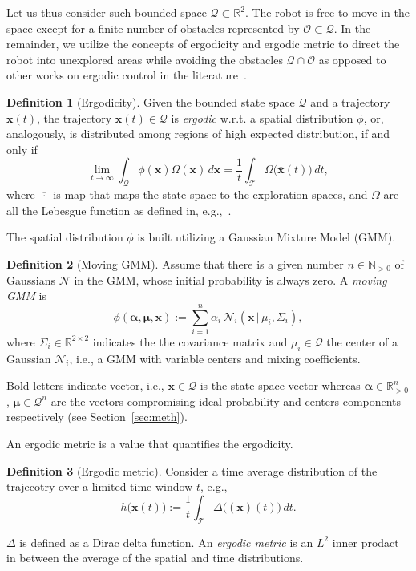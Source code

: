 \documentclass[letterpaper,10pt,conference,twoside]{IEEEtran}
\theoremstyle{definition}
\newtheorem{defn}{Definition}[section]
\begin{document}
Let us thus consider such bounded space $\mathcal{Q}\subset\mathbb{R}^2$. The robot is free to move in the space except for a finite number of obstacles represented by $\mathcal{O}\subset\mathcal{Q}$.  
In the remainder, we utilize the concepts of ergodicity and ergodic metric to direct the robot into unexplored areas while avoiding the obstacles $\mathcal{Q}\cap\mathcal{O}$ as opposed to other works on ergodic control in the literature~\cite{}.
\begin{defn}[Ergodicity]
  Given the bounded state space $\mathcal{Q}$ and a trajectory $\mathbf{x}(t)$, the trajectory $\mathbf{x}(t)\in\mathcal{Q}$ is \textit{ergodic} w.r.t. a spatial distribution $\phi$, or, analogously, is distributed among regions of high expected distribution, if and only if
  \begin{equation}
    \lim_{t\rightarrow\infty}{\int_{\mathcal{Q}}\phi(\mathbf{x})\Omega(\mathbf{x})\,d\mathbf{x}=\frac{1}{t}\int_{\mathcal{T}}{{\Omega\big(\overline{\mathbf{x}}(t)\big)}}\,dt},
  \end{equation}
  where $\overline{\,\cdot\,}$ is map that maps the state space to the exploration spaces, and $\Omega$ are all the Lebesgue function as defined in, e.g.,~\cite{}.
\end{defn}

The spatial distribution $\phi$ is built utilizing a Gaussian Mixture Model (GMM). 
\begin{defn}[Moving GMM]
  Assume that there is a given number $n\in\mathbb{N}_{>0}$ of Gaussians $\mathcal{N}$ in the GMM, whose initial probability is always zero. A \textit{moving GMM} is
  \begin{equation}
    \phi(\boldsymbol{\alpha},\boldsymbol{\mu},\mathbf{x}):=\sum_{i=1}^n{\alpha_i\,\mathcal{N}_i(\mathbf{x}\,|\,\mu_i,\Sigma_i)},
  \end{equation}
  where $\Sigma_i\in\mathbb{R}^{2\times 2}$ indicates the the covariance matrix and $\mu_i\in\mathcal{Q}$ the center of a Gaussian $\mathcal{N}_i$, i.e., a GMM with variable centers and mixing coefficients.
  
  Bold letters indicate vector, i.e., $\mathbf{x}\in\mathcal{Q}$ is the state space vector whereas $\boldsymbol{\alpha}\in\mathbb{R}_{>0}^n$, $\boldsymbol{\mu}\in\mathcal{Q}^n$ are the vectors compromising ideal probability and centers components respectively (see Section~\ref{sec:meth}).
   
\end{defn}

An ergodic metric is a value that quantifies the ergodicity.
\begin{defn}[Ergodic metric]
  Consider a time average distribution of the trajecotry over a limited time window $t$, e.g.,
  \begin{equation}
    h\big(\mathbf{x}(t)\big):=\frac{1}{t}\int_\mathcal{T}\Delta\big((\mathbf{x})(t)\big)\,dt.
  \end{equation}

  $\Delta$ is defined as a Dirac delta function. An \textit{ergodic metric} is an $L^2$ inner prodact in between the average of the spatial and time distributions.
\end{defn}
\end{document}
